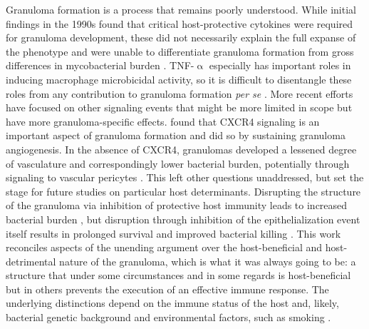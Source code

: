 Granuloma formation is a process that remains poorly understood. While initial findings in the 1990s found that critical host\hyp{}protective cytokines were required for granuloma development, these did not necessarily explain the full expanse of the phenotype and were unable to differentiate granuloma formation from gross differences in mycobacterial burden \citep{Flynn1993, Flynn1995}. TNF\hyp{}$\upalpha$ especially has important roles in inducing macrophage microbicidal activity, so it is difficult to disentangle these roles from any contribution to granuloma formation \textit{per se} \citep{Ramakrishnan2013a}. More recent efforts have focused on other signaling events that might be more limited in scope but have more granuloma\hyp{}specific effects. \citet{Torraca2017} found that CXCR4 signaling is an important aspect of granuloma formation and did so by sustaining granuloma angiogenesis. In the absence of CXCR4, granulomas developed a lessened degree of vasculature and correspondingly lower bacterial burden, potentially through signaling to vascular pericytes \citep{Pollard2009}. This left other questions unaddressed, but set the stage for future studies on particular host determinants. Disrupting the structure of the granuloma via inhibition of protective host immunity leads to increased bacterial burden \citep{Flynn1993, Flynn1995, Juffermans2000, McElvaniaTekippe2010}, but disruption through inhibition of the epithelialization event itself results in prolonged survival and improved bacterial killing \citep{Cronan2016}. This work reconciles aspects of the unending argument over the host\hyp{}beneficial and host\hyp{}detrimental nature of the granuloma, which is what it was always going to be: a structure that under some circumstances and in some regards is host\hyp{}beneficial but in others prevents the execution of an effective immune response. The underlying distinctions depend on the immune status of the host and, likely, bacterial genetic background and environmental factors, such as smoking \citep{Glickman2016}. 

